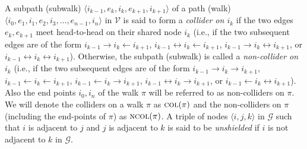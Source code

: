 \documentclass[twoside,11pt]{article}
\newcommand\C[1]{\mathcal{#1}}
\newcommand\mathbfsc[1]{\text{\normalfont\scshape#1}}
\newcommand\ncol[1]{\mathbfsc{ncol}(#1)}
\newcommand\col[1]{\mathbfsc{col}(#1)}
\newcommand{\ot}{\leftarrow}
\newcommand{\oto}{\leftrightarrow}
\begin{document}
A subpath (subwalk) $\langle i_{k-1},e_k,i_k,e_{k+1},i_{k+1} \rangle$ of a path 
(walk) $\langle i_0,e_1,i_1,e_2,i_3,\dots,e_{n-1},i_n \rangle$ in $\C{V}$ is said to 
form a \emph{collider on $i_k$}
if the two edges $e_k,e_{k+1}$ meet head-to-head on their shared node $i_k$ (i.e., if the two
subsequent edges are of the form $i_{k-1} \to i_k \ot i_{k+1}$, $i_{k-1} \oto i_k \ot i_{k+1}$, 
$i_{k-1} \to i_k \oto i_{k+1}$, or $i_{k-1} \oto i_k \oto i_{k+1}$). Otherwise, the subpath
(subwalk) is called a \emph{non-collider on $i_k$} (i.e., if the two
subsequent edges are of the form $i_{k-1} \to i_k \to i_{k+1}$, $i_{k-1} \ot i_k \ot i_{k+1}$,
$i_{k-1} \ot i_k \to i_{k+1}$, $i_{k-1} \oto i_k \to i_{k+1}$, or $i_{k-1} \ot i_k \oto i_{k+1}$).
Also the end points $i_0, i_n$ of the walk $\pi$ will be referred to as non-colliders on $\pi$.
We will denote the colliders on a walk $\pi$ as $\col{\pi}$ and the non-colliders on $\pi$
(including the end-points of $\pi$) as $\ncol{\pi}$.
A triple of nodes $\langle i,j,k \rangle$ in $\C{G}$ such that $i$ is adjacent to $j$ and $j$ is adjacent
to $k$ is said to be \emph{unshielded} if $i$ is not adjacent to $k$ in $\C{G}$.
\end{document}

